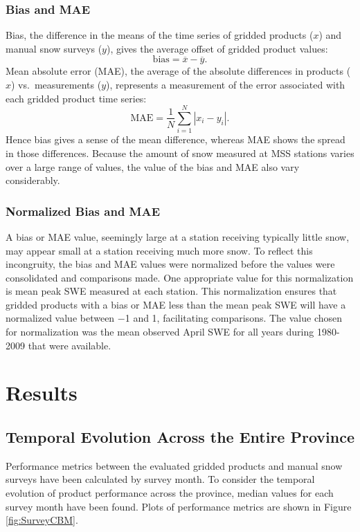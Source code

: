 \documentclass[12pt]{article}
\begin{document}
\subsubsection{Bias and MAE}
Bias, the difference in the means of the time series of gridded products ($x$) and manual snow surveys ($y$), gives the average offset of gridded product values:
\begin{equation}
\text{bias} =  \overline{x} - \overline{y}.
\end{equation}
Mean absolute error (MAE), the average of the absolute differences in products ($x$) vs.\ measurements ($y$), represents a measurement of the error associated with each gridded product time series:
\begin{equation}
\text{MAE} = \frac{1}{N}\sum_{i=1}^{N}|x_i-y_i|.
\end{equation}
Hence bias gives a sense of the mean difference, whereas MAE shows the spread in those differences.  Because the amount of snow measured at MSS stations varies over a large range of values, the value of the bias and MAE also vary considerably.  

\subsubsection{Normalized Bias and MAE}
A bias or MAE value, seemingly large at a station receiving typically little snow, may appear small at a station receiving much more snow.
To reflect this incongruity, the bias and MAE values were normalized before the values were consolidated and comparisons made.  One appropriate value for this normalization is mean peak SWE measured at each station.  This normalization ensures that gridded products with a bias or MAE less than the mean peak SWE will have a normalized value between $-$1 and 1, facilitating comparisons.  The value chosen for normalization was the mean observed April SWE for all years during 1980-2009 that were available.  

\section{Results}

\subsection{Temporal Evolution Across the Entire Province}
Performance metrics between the evaluated gridded products and manual snow surveys have been calculated by survey month.  To consider the temporal evolution of product performance across the province, median values for each survey month have been found.  Plots of performance metrics are shown in Figure \ref{fig:SurveyCBM}.
\end{document}
